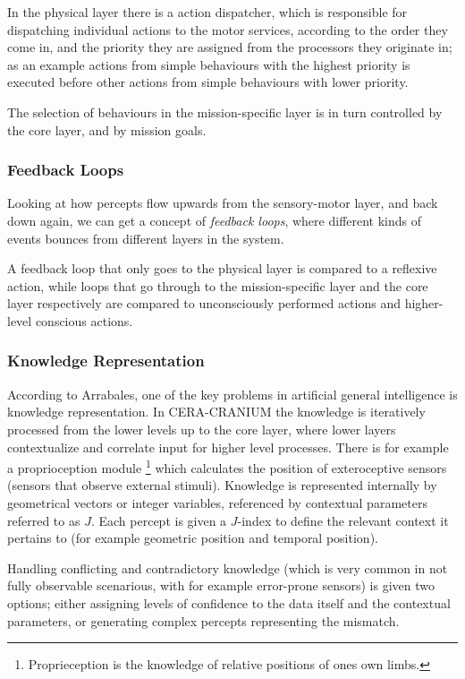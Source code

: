 In the physical layer there is a action dispatcher, which is responsible for
dispatching individual actions to the motor services, according to the order
they come in, and the priority they are assigned from the processors they
originate in; as an example actions from simple behaviours with the highest
priority is executed before other actions from simple behaviours with lower
priority.

The selection of behaviours in the mission-specific layer is in turn controlled
by the core layer, and by mission goals.

\subsubsection{Feedback Loops}
Looking at how percepts flow upwards from the sensory-motor layer, and back
down again, we can get a concept of \textit{feedback loops}, where different
kinds of events bounces from different layers in the system.

A feedback loop that only goes to the physical layer is compared to a reflexive
action, while loops that go through to the mission-specific layer and the core
layer respectively are compared to unconsciously performed actions and
higher-level conscious actions.

\subsubsection{Knowledge Representation}
According to Arrabales\cite{arrabales2009ceracranium}, one of the key problems
in artificial general intelligence is knowledge representation. In CERA-CRANIUM
the knowledge is iteratively processed from the lower levels up to the core
layer, where lower layers contextualize and correlate input for higher level
processes. There is for example a proprioception module \footnote{Proprieception
is the knowledge of relative positions of ones own limbs.} which calculates the
position of exteroceptive sensors (sensors that observe external stimuli).
Knowledge is represented internally by geometrical vectors or integer variables,
referenced by contextual parameters referred to as $J$. Each percept is given a
$J$-index to define the relevant context it pertains to (for example geometric
position and temporal position).

Handling conflicting and contradictory knowledge (which is very common in not
fully observable scenarious, with for example error-prone sensors) is given two
options; either assigning levels of confidence to the data itself and the
contextual parameters, or generating complex percepts representing the mismatch.

